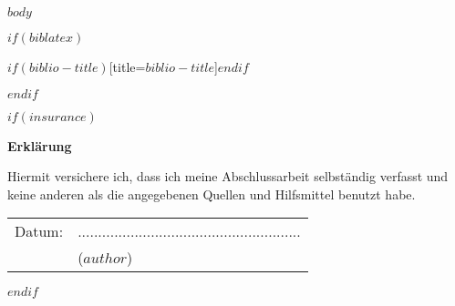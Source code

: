 \documentclass[12pt,a4paper,bibliography=totocnumbered,listof=totocnumbered]{scrartcl}
\begin{document}
\renewcommand{\sectionmark}[1]{\markright{#1}}
\renewcommand{\subsectionmark}[1]{}
\renewcommand{\subsubsectionmark}[1]{}
\rhead{} %

\onehalfspacing
\renewcommand{\thesection}{\arabic{section}}
\renewcommand{\theHsection}{\arabic{section}}
\setcounter{section}{0}
\setcounter{page}{1}


$body$



$if(biblatex)$
\renewcommand\refname{Quellenverzeichnis}


\pagebreak

\printbibliography$if(biblio-title)$[title=$biblio-title$]$endif$

$endif$


$if(insurance)$
\newpage
\thispagestyle{empty}
\begin{center}
	\vspace*{5em}
	\huge\textbf{Erklärung}\\
\end{center}
\vspace{2em}
Hiermit versichere ich, dass ich meine Abschlussarbeit selbständig verfasst und keine anderen als die angegebenen Quellen und Hilfsmittel benutzt habe.

\vspace{4em}
\begin{minipage}{\linewidth}
	\begin{tabular}{p{15em}p{15em}}
		Datum: &  .......................................................\\
		& \centering ($author$)\\
	\end{tabular}
\end{minipage}
$endif$
\end{document}
